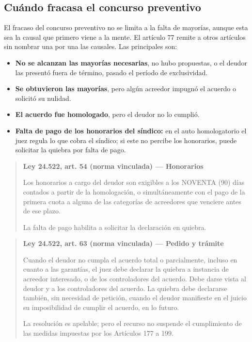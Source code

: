 \documentclass[12pt,oneside]{book}
\newenvironment{articulo}[1]
  {\begin{quote}\small\textbf{#1}\par\smallskip}
  {\end{quote}}
\begin{document}
\subsection{Cuándo fracasa el concurso preventivo}

El fracaso del concurso preventivo no se limita a la falta de mayorías, aunque esta sea la causal que primero viene a la mente. El artículo 77 remite a otros artículos sin nombrar una por una las causales. Las principales son:

\begin{itemize}
    \item \textbf{No se alcanzan las mayorías necesarias}, no hubo propuestas, o el deudor las presentó fuera de término, pasado el período de exclusividad.
    \item \textbf{Se obtuvieron las mayorías}, pero algún acreedor impugnó el acuerdo o solicitó su nulidad.
    \item \textbf{El acuerdo fue homologado}, pero el deudor no lo cumplió.
    \item \textbf{Falta de pago de los honorarios del síndico:} en el auto homologatorio el juez regula lo que cobra el síndico; si este no percibe los honorarios, puede solicitar la quiebra por falta de pago.
\end{itemize}

\begin{articulo}{Ley 24.522, art. 54 (norma vinculada) --- Honorarios}
Los honorarios a cargo del deudor son exigibles a los NOVENTA (90) días contados a partir de la homologación, o simultáneamente con el pago de la primera cuota a alguna de las categorías de acreedores que venciere antes de ese plazo.

La falta de pago habilita a solicitar la declaración en quiebra.
\end{articulo}

\begin{articulo}{Ley 24.522, art. 63 (norma vinculada) --- Pedido y trámite}
Cuando el deudor no cumpla el acuerdo total o parcialmente, incluso en cuanto a las garantías, el juez debe declarar la quiebra a instancia de acreedor interesado, o de los controladores del acuerdo. Debe darse vista al deudor y a los controladores del acuerdo. La quiebra debe declararse también, sin necesidad de petición, cuando el deudor manifieste en el juicio su imposibilidad de cumplir el acuerdo, en lo futuro.

La resolución es apelable; pero el recurso no suspende el cumplimiento de las medidas impuestas por los Artículos 177 a 199.
\end{articulo}
\end{document}
